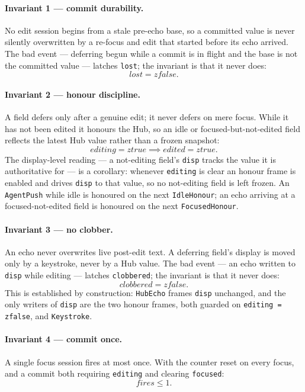 \documentclass[a4paper,10pt,fleqn]{article}
\begin{document}
\paragraph{Invariant 1 --- commit durability.}
No edit session begins from a stale pre-echo base, so a committed value is never
silently overwritten by a re-focus and edit that started before its echo
arrived.  The bad event --- deferring begun while a commit is in flight and the
base is not the committed value --- latches \texttt{lost}; the invariant is that
it never does:
\[
  lost = zfalse.
\]

\paragraph{Invariant 2 --- honour discipline.}
A field defers only after a genuine edit; it never defers on mere focus.  While
it has not been edited it honours the Hub, so an idle or focused-but-not-edited
field reflects the latest Hub value rather than a frozen snapshot:
\[
  editing = ztrue \implies edited = ztrue.
\]
The display-level reading --- a not-editing field's \texttt{disp} tracks the
value it is authoritative for --- is a corollary: whenever \texttt{editing} is
clear an honour frame is enabled and drives \texttt{disp} to that value, so no
not-editing field is left frozen.  An \texttt{AgentPush} while idle is honoured
on the next \texttt{IdleHonour}; an echo arriving at a focused-not-edited field
is honoured on the next \texttt{FocusedHonour}.

\paragraph{Invariant 3 --- no clobber.}
An echo never overwrites live post-edit text.  A deferring field's display is
moved only by a keystroke, never by a Hub value.  The bad event --- an echo
written to \texttt{disp} while editing --- latches \texttt{clobbered}; the
invariant is that it never does:
\[
  clobbered = zfalse.
\]
This is established by construction: \texttt{HubEcho} frames \texttt{disp}
unchanged, and the only writers of \texttt{disp} are the two honour frames, both
guarded on \texttt{editing = zfalse}, and \texttt{Keystroke}.

\paragraph{Invariant 4 --- commit once.}
A single focus session fires at most once.  With the counter reset on every
focus, and a commit both requiring \texttt{editing} and clearing
\texttt{focused}:
\[
  fires \leq 1.
\]
\end{document}
